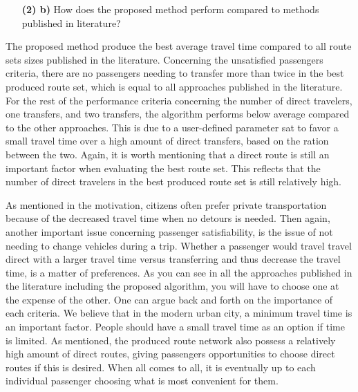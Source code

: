\begin{itemize}
\item[\textbf{(2) b)}] How does the proposed method perform compared to methods published in literature?
\end{itemize}

The proposed method produce the best average travel time compared to all route sets sizes published in the literature. Concerning the unsatisfied passengers criteria, there are no passengers needing to transfer more than twice in the best produced route set, which is equal to all approaches published in the literature. For the rest of the performance criteria concerning the number of direct travelers, one transfers, and two transfers, the algorithm performs below average compared to the other approaches. This is due to a user-defined parameter sat to favor a small travel time over a high amount of direct transfers, based on the ration between the two. Again, it is worth mentioning that a direct route is still an important factor when evaluating the best route set. This reflects that the number of direct travelers in the best produced route set is still relatively high.

As mentioned in the motivation, citizens often prefer private transportation because of the decreased travel time when no detours is needed. Then again, another important issue concerning passenger satisfiability, is the issue of not needing to change vehicles during a trip. Whether a passenger would travel travel direct with a larger travel time versus transferring and thus decrease the travel time, is a matter of preferences. As you can see in all the approaches published in the literature including the proposed algorithm, you will have to choose one at the expense of the other. One can argue back and forth on the importance of each criteria. We believe that in the modern urban city, a minimum travel time is an important factor. People should have a small travel time as an option if time is limited. As mentioned, the produced route network also possess a relatively high amount of direct routes, giving passengers opportunities to choose direct routes if this is desired. %
When all comes to all, it is eventually up to each individual passenger choosing what is most convenient for them. 


